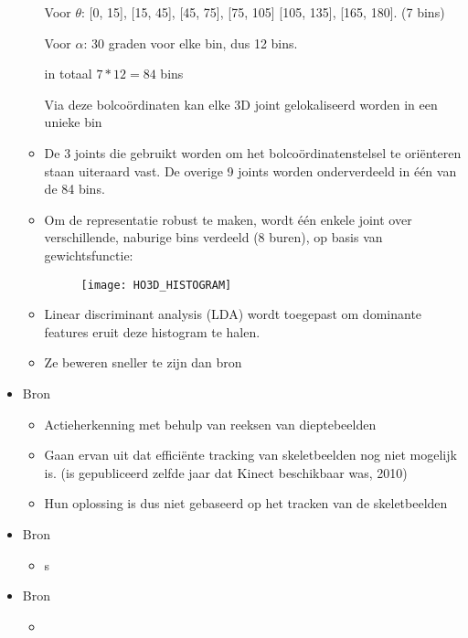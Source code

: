 \begin{itemize}
\begin{itemize}
			Voor $\theta$: [0, 15], [15, 45], [45, 75], [75, 105] [105, 135], [165, 180]. (7 bins)
			
			Voor $\alpha$: 30 graden voor elke bin, dus 12 bins.
			
			in totaal $7 * 12 = 84$ bins
		
			
			Via deze bolcoördinaten kan elke 3D joint gelokaliseerd worden in een unieke bin 
			\item De 3 joints die gebruikt worden om het bolcoördinatenstelsel te oriënteren staan uiteraard vast. De overige 9 joints worden onderverdeeld in één van de 84 bins. 
			
			\item Om de representatie robust te maken, wordt één enkele joint over verschillende, naburige bins verdeeld (8 buren), op basis van gewichtsfunctie:

			
			\begin{figure}[ht]
				\centering
				\texttt{[image: HO3D\_HISTOGRAM]}
			\end{figure}
			
			\item Linear discriminant analysis (LDA) wordt toegepast om dominante features eruit deze histogram te halen.
			
			
			\item Ze beweren sneller te zijn dan bron \cite{action-recognition-based-bag-3d-points}
		\end{itemize}
	\item Bron \cite{action-recognition-based-bag-3d-points}
	\begin{itemize}
		\item Actieherkenning met behulp van reeksen van dieptebeelden
		\item Gaan ervan uit dat efficiënte tracking van skeletbeelden nog niet mogelijk is. (is gepubliceerd zelfde jaar dat Kinect beschikbaar was, 2010)
		\item Hun oplossing is dus niet gebaseerd op het tracken van de skeletbeelden
	\end{itemize}



	\item Bron \cite{keep-it-simple-and-sparse-real-time-action-recognition}
	\begin{itemize}
		\item s
	\end{itemize}

	\item Bron \cite{enhanced-computer-vision-with-microsoft-kinect-sensor}
	\begin{itemize}
		\item 
	\end{itemize}
\end{itemize}